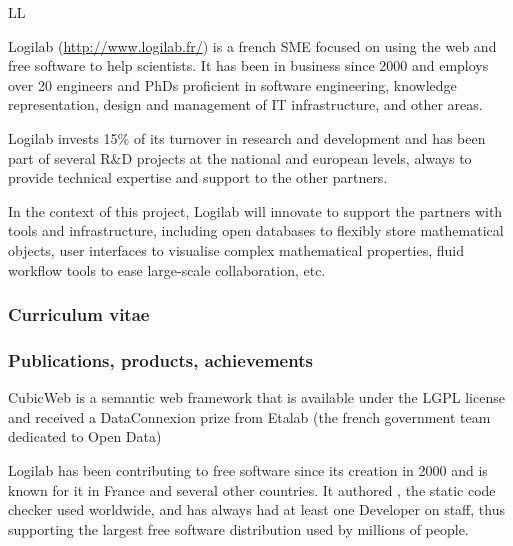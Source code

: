 \begin{sitedescription}{LL}

Logilab (\url{http://www.logilab.fr/}) is a french SME focused on using the web and free software to help
scientists. It has been in business since 2000 and employs over 20 engineers and
PhDs proficient in software engineering, knowledge representation, design and
management of IT infrastructure, and other areas.

Logilab invests 15\% of its turnover in research and development and has been
part of several R\&D projects at the national and european levels, always to
provide technical expertise and support to the other partners.

In the context of this project, Logilab will innovate to support the partners
with tools and infrastructure, including open databases to flexibly store
mathematical objects, user interfaces to visualise complex mathematical
properties, fluid workflow tools to ease large-scale collaboration, etc.



\subsubsection*{Curriculum vitae}








\subsubsection*{Publications, products, achievements}

\begin{compactenum}
 \item CubicWeb is a semantic web framework that is available under the LGPL
   license and received a DataConnexion prize from Etalab (the french government
   team dedicated to Open Data)

\item Logilab has been contributing to free software since its creation in 2000
  and is known for it in France and several other countries. It authored ,
  the static \Python code checker used worldwide, and has always had at least one
   Developer on staff, thus supporting the largest free software
  distribution used by millions of people.


\end{compactenum}
\end{sitedescription}
